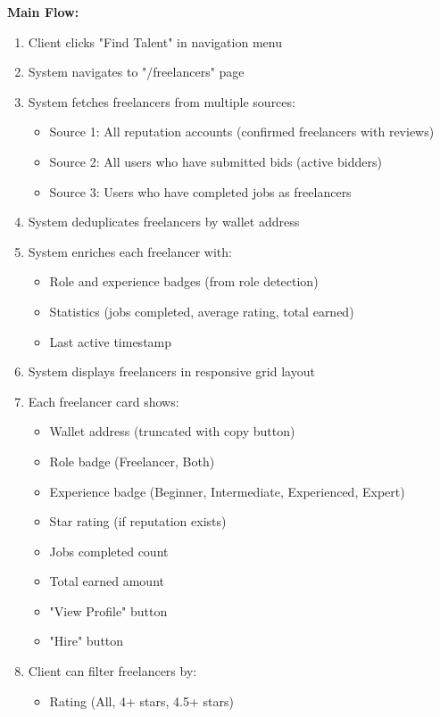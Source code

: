 \documentclass[a4paper,13pt,twoside]{report}
\theoremstyle{definition}
\begin{document}
\textbf{Main Flow:}
\begin{enumerate}
    \item Client clicks "Find Talent" in navigation menu
    \item System navigates to "/freelancers" page
    \item System fetches freelancers from multiple sources:
    \begin{itemize}
        \item Source 1: All reputation accounts (confirmed freelancers with reviews)
        \item Source 2: All users who have submitted bids (active bidders)
        \item Source 3: Users who have completed jobs as freelancers
    \end{itemize}
    \item System deduplicates freelancers by wallet address
    \item System enriches each freelancer with:
    \begin{itemize}
        \item Role and experience badges (from role detection)
        \item Statistics (jobs completed, average rating, total earned)
        \item Last active timestamp
    \end{itemize}
    \item System displays freelancers in responsive grid layout
    \item Each freelancer card shows:
    \begin{itemize}
        \item Wallet address (truncated with copy button)
        \item Role badge (Freelancer, Both)
        \item Experience badge (Beginner, Intermediate, Experienced, Expert)
        \item Star rating (if reputation exists)
        \item Jobs completed count
        \item Total earned amount
        \item "View Profile" button
        \item "Hire" button
    \end{itemize}
    \item Client can filter freelancers by:
    \begin{itemize}
        \item Rating (All, 4+ stars, 4.5+ stars)

\end{itemize}
\end{enumerate}
\end{document}

